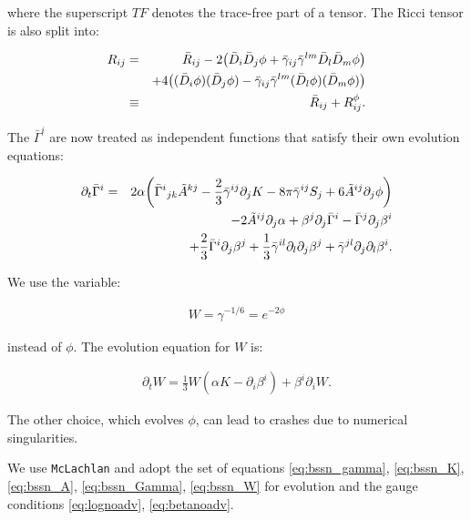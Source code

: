 \documentclass[%
 reprint,
 amsmath,amssymb,
 aps,
 prd,
]{revtex4-2}
\begin{document}
where the superscript $TF$ denotes the trace-free part of a tensor. The Ricci tensor is also split into:

\begin{eqnarray}
	R_{ij}
	&=& \bar{R}_{ij} - 2 \qty(\bar{D}_i\bar{D}_j \phi + \bar{\gamma}_{ij}\bar{\gamma}^{lm}\bar{D}_l \bar{D}_m \phi)\nonumber\\&&+4\qty((\bar{D}_i \phi)(\bar{D}_j \phi) - \bar{\gamma}_{ij}\bar{\gamma}^{lm}(\bar{D}_l \phi)(\bar{D}_m \phi) )\nonumber\\
	&\equiv& \bar{R}_{ij} + R^\phi_{ij}.
\end{eqnarray}

The $\bar{\Gamma}^{i}$ are now treated as independent functions that satisfy their own evolution equations:

\begin{eqnarray}
	\label{eq:bssn_Gamma}
	\partial_t \bar{\Gamma}^i &=& 2\alpha \qty(\bar{\Gamma}^i{}_{jk} \tilde{A}^{kj} - \frac{2}{3}\bar{\gamma}^{ij}\partial_j K - 8\pi \bar{\gamma}^{ij} S_j + 6\tilde{A}^{ij}\partial_j \phi) \nonumber\\&& -2\tilde{A}^{ij}\partial_j \alpha + \beta^j \partial_j \bar{\Gamma}^i - \bar{\Gamma}^j \partial_j \beta^i \nonumber\\&&+ \frac{2}{3}\bar{\Gamma}^i \partial_j \beta^j + \frac{1}{3}\bar{\gamma}^{il}\partial_l \partial_j \beta^j + \bar{\gamma}^{jl}\partial_j\partial_l\beta^i.
\end{eqnarray}

We use the variable:

\begin{eqnarray}
	W = \gamma^{-1/6} = e^{-2\phi}
\end{eqnarray}

instead of $\phi$. The evolution equation for $W$ is:

\begin{eqnarray}
	\label{eq:bssn_W}
	\partial_t W = \frac{1}{3}W(\alpha K - \partial_i \beta^i)+\beta^i \partial_i W.
\end{eqnarray}

The other choice, which evolves $\phi$, can lead to crashes due to numerical singularities.

We use \texttt{McLachlan} \cite{Brown:2008sb, Kranc:web, McLachlan:web} and adopt the set of equations \eqref{eq:bssn_gamma}, \eqref{eq:bssn_K}, \eqref{eq:bssn_A}, \eqref{eq:bssn_Gamma}, \eqref{eq:bssn_W} for evolution and the gauge conditions \eqref{eq:lognoadv}, \eqref{eq:betanoadv}.
\end{document}
